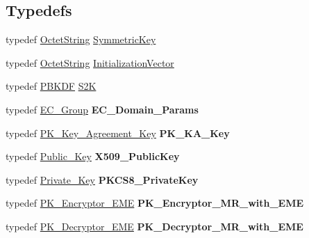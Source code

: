 \subsection*{Typedefs}
\begin{DoxyCompactItemize}
\item 
typedef \hyperlink{classBotan_1_1OctetString}{Octet\-String} \hyperlink{namespaceBotan_a00c78597211d5c63b63e2a57ddb96d38}{Symmetric\-Key}
\item 
typedef \hyperlink{classBotan_1_1OctetString}{Octet\-String} \hyperlink{namespaceBotan_ab6a07e859c4e3a2ccfd68308ec89497e}{Initialization\-Vector}
\item 
typedef \hyperlink{classBotan_1_1PBKDF}{P\-B\-K\-D\-F} \hyperlink{namespaceBotan_a5205c90055f402fac271c40e30dd64ba}{S2\-K}
\item 
\hypertarget{namespaceBotan_a5a6ad46a3e0235b7d8fa64faa2a9f17a}{typedef \hyperlink{classBotan_1_1EC__Group}{E\-C\-\_\-\-Group} {\bfseries E\-C\-\_\-\-Domain\-\_\-\-Params}}\label{namespaceBotan_a5a6ad46a3e0235b7d8fa64faa2a9f17a}

\item 
\hypertarget{namespaceBotan_a5987a442abe68fb99c26a05f2965abe5}{typedef \hyperlink{classBotan_1_1PK__Key__Agreement__Key}{P\-K\-\_\-\-Key\-\_\-\-Agreement\-\_\-\-Key} {\bfseries P\-K\-\_\-\-K\-A\-\_\-\-Key}}\label{namespaceBotan_a5987a442abe68fb99c26a05f2965abe5}

\item 
\hypertarget{namespaceBotan_add0fa31967ac5460a26278c11eb9142f}{typedef \hyperlink{classBotan_1_1Public__Key}{Public\-\_\-\-Key} {\bfseries X509\-\_\-\-Public\-Key}}\label{namespaceBotan_add0fa31967ac5460a26278c11eb9142f}

\item 
\hypertarget{namespaceBotan_aa653260f8a83c2d5905a709495f2b61c}{typedef \hyperlink{classBotan_1_1Private__Key}{Private\-\_\-\-Key} {\bfseries P\-K\-C\-S8\-\_\-\-Private\-Key}}\label{namespaceBotan_aa653260f8a83c2d5905a709495f2b61c}

\item 
\hypertarget{namespaceBotan_a7524dad574c35a7b4c56e47e8ca3e6b2}{typedef \hyperlink{classBotan_1_1PK__Encryptor__EME}{P\-K\-\_\-\-Encryptor\-\_\-\-E\-M\-E} {\bfseries P\-K\-\_\-\-Encryptor\-\_\-\-M\-R\-\_\-with\-\_\-\-E\-M\-E}}\label{namespaceBotan_a7524dad574c35a7b4c56e47e8ca3e6b2}

\item 
\hypertarget{namespaceBotan_aa45fdace014360b6c4f9106d787234e4}{typedef \hyperlink{classBotan_1_1PK__Decryptor__EME}{P\-K\-\_\-\-Decryptor\-\_\-\-E\-M\-E} {\bfseries P\-K\-\_\-\-Decryptor\-\_\-\-M\-R\-\_\-with\-\_\-\-E\-M\-E}}\label{namespaceBotan_aa45fdace014360b6c4f9106d787234e4}


\end{DoxyCompactItemize}
